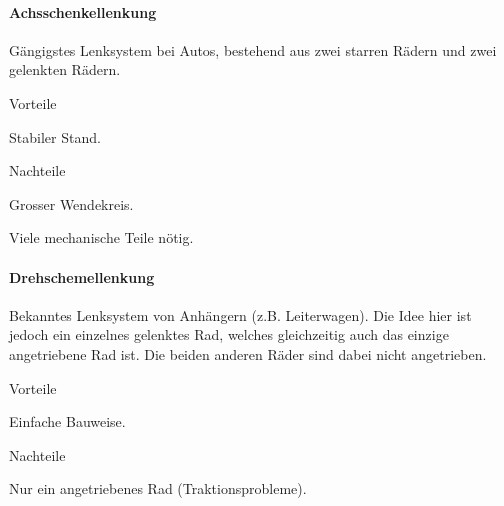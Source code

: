 \documentclass[../main.tex]{subfiles}
\begin{document}
\paragraph{Achsschenkellenkung} \label{recherche-achsschenkellenkung}

Gängigstes Lenksystem bei Autos, bestehend aus zwei starren Rädern und zwei gelenkten Rädern.

\begin{minipage}[t]{0.48\textwidth}
    \begin{items}
      \item [Vorteile]
      \item Stabiler Stand.
 \end{items}
\end{minipage}
\hfill
\begin{minipage}[t]{0.48\textwidth}
    \begin{items}
      \item [Nachteile]
      \item Grosser Wendekreis.
      \item Viele mechanische Teile nötig.
    \end{items}
\end{minipage}

\paragraph{Drehschemellenkung} \label{recherche-drehschemellenkung}

Bekanntes Lenksystem von Anhängern (z.B. Leiterwagen). Die Idee hier ist jedoch ein einzelnes gelenktes Rad, welches gleichzeitig auch das einzige angetriebene Rad ist. Die beiden anderen Räder sind dabei nicht angetrieben.

\begin{minipage}[t]{0.48\textwidth}
    \begin{items}
      \item [Vorteile]
      \item Einfache Bauweise.
 \end{items}
\end{minipage}
\hfill
\begin{minipage}[t]{0.48\textwidth}
    \begin{items}
      \item [Nachteile]
      \item Nur ein angetriebenes Rad (Traktionsprobleme).
    \end{items}
\end{minipage}
\end{document}

